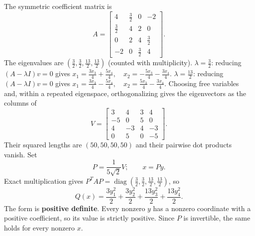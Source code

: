The symmetric coefficient matrix is
\[
 A=\begin{bmatrix}4&\frac{3}{2}&0&-2\\\frac{3}{2}&4&2&0\\0&2&4&\frac{3}{2}\\-2&0&\frac{3}{2}&4\end{bmatrix}.
\]
The eigenvalues are $(\frac{3}{2},\frac{3}{2},\frac{13}{2},\frac{13}{2})$ (counted with multiplicity).
$\lambda=\frac{3}{2}$: reducing $(A-\lambda I)v=0$ gives
\( x_{1}=\frac{3 x_{3}}{4} + \frac{5 x_{4}}{4},\quad x_{2}=- \frac{5 x_{3}}{4} - \frac{3 x_{4}}{4} \).
$\lambda=\frac{13}{2}$: reducing $(A-\lambda I)v=0$ gives
\( x_{1}=\frac{3 x_{3}}{4} - \frac{5 x_{4}}{4},\quad x_{2}=\frac{5 x_{3}}{4} - \frac{3 x_{4}}{4} \).
Choosing free variables and, within a repeated eigenspace, orthogonalizing
gives the eigenvectors as the columns of
\[
 V=\begin{bmatrix}3&4&3&4\\-5&0&5&0\\4&-3&4&-3\\0&5&0&-5\end{bmatrix}.
\]
Their squared lengths are $(50,50,50,50)$ and their pairwise dot products vanish. Set
\[
 P=\frac1{5 \sqrt{2}}V;\qquad x=Py.
\]
Exact multiplication gives $P^TAP=\operatorname{diag}(\frac{3}{2},\frac{3}{2},\frac{13}{2},\frac{13}{2})$, so
\[
 Q(x)=\boxed{\frac{3 y_{1}^{2}}{2} + \frac{3 y_{2}^{2}}{2} + \frac{13 y_{3}^{2}}{2} + \frac{13 y_{4}^{2}}{2}}.
\]
The form is \textbf{positive definite}. Every nonzero $y$ has a nonzero coordinate with a positive coefficient,
so its value is strictly positive. Since $P$ is invertible, the same holds
for every nonzero $x$.

